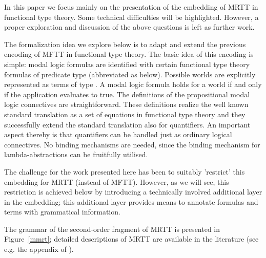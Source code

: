 \begin{isabellebody}
\begin{isamarkuptext}
  In this paper we focus mainly on the presentation of the embedding of MRTT in functional type theory.
  Some technical difficulties will be highlighted. However, a proper exploration and discussion of 
  the above questions is left as further work.
 


  The formalization idea we explore below is to adapt and extend the previous encoding of MFTT in 
  functional type theory. 
  The basic idea of this encoding is simple: modal logic formulas are identified with certain functional 
  type theory formulas of predicate type  (abbreviated as  below). 
  Possible worlds are explicitly represented as
  terms of type  . A modal logic formula \isa{{\isasymphi}} holds for a world  if and 
  only if the application  evaluates to true. The definitions of the propositional modal logic 
  connectives are straightforward. These definitions realize the well known standard translation as a set of equations 
  in functional type theory and they successfully extend the standard translation also for quantifiers. An important
  aspect thereby is that quantifiers can be handled just as ordinary logical connectives. No binding mechanisms are needed,
  since the binding mechanism for lambda-abstractions can be fruitfully utilised.
  
  The challenge for the work presented here has been to suitably 'restrict' this embedding for MRTT (instead of MFTT).
  However, as we will see, this restriction is achieved below by introducing a technically involved 
  additional layer in the embedding; this additional layer provides means to annotate formulas and terms with
  grammatical information.
 
  The grammar of the second-order fragment of MRTT is presented in Figure~\ref{mmrt}; detailed descriptions
  of MRTT are available in the literature (see e.g. the appendix of \cite{Zalta88}).
 

\end{isamarkuptext}
\end{isabellebody}
